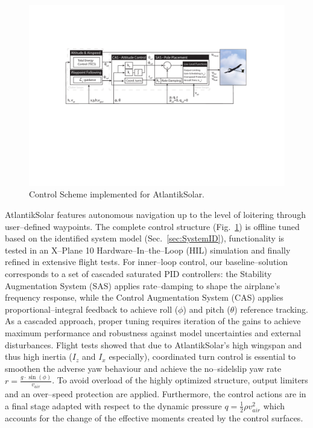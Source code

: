 
\begin{figure}[tb]
    \centering
     \includegraphics[width=\linewidth]{images/11_ControlScheme/ControlScheme.pdf}
    \caption{Control Scheme implemented for AtlantikSolar.}
    \label{fig:ControlScheme}
\end{figure}

AtlantikSolar features autonomous navigation up to the level of loitering through user--defined waypoints. The complete control structure (Fig.~\ref{fig:ControlScheme}) is offline tuned based on the identified system model (Sec.~\ref{sec:SystemID}), functionality is tested in an X--Plane 10 Hardware--In--the--Loop (HIL) simulation and finally refined in extensive flight tests. For inner--loop control, our baseline--solution corresponds to a set of cascaded saturated PID controllers: the Stability Augmentation System (SAS) applies rate--damping to shape the airplane's frequency response, while the Control Augmentation System (CAS) applies proportional--integral feedback to achieve roll ($\phi$) and pitch ($\theta$) reference tracking. As a cascaded approach, proper tuning requires iteration of the gains to achieve maximum performance and robustness against model uncertainties and external disturbances. Flight tests showed that due to AtlantikSolar's high wingspan and thus high inertia ($I_z$ and $I_x$ especially), coordinated turn control is essential to smoothen the adverse yaw behaviour and achieve the no--sidelslip yaw rate $r=\frac{g\cdot \sin(\phi)}{v_{air}}$. To avoid overload of the highly optimized structure, output limiters and an over--speed protection are applied. Furthermore, the control actions are in a final stage adapted with respect to the dynamic pressure $q=\frac{1}{2}\rho v^{2}_{air}$ which accounts for the change of the effective moments created by the control surfaces. 

